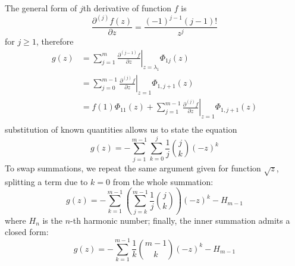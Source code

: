 The general form of $j$th derivative of function $f$ is 
$$\frac{\partial^{(j)}{f}(z)}{\partial{z}} =\frac{(-1)^{j-1}(j-1)!}{z^{j}}  $$ 
for $j \geq 1$, therefore
\begin{displaymath}
\begin{split}
  g(z) &= \sum_{j=1}^{m}{ \left. \frac{\partial^{(j-1)}{f}}{\partial{z}} \right|_{z=\lambda_{1}}\Phi_{1j}(z)} \\
       &= \sum_{j=0}^{m-1}{ \left. \frac{\partial^{(j)}{f}}{\partial{z}} \right|_{z=1}\Phi_{1,j+1}(z)} \\
       &= f(1)\Phi_{11}(z) + \sum_{j=1}^{m-1}{ \left. \frac{\partial^{(j)}{f}}{\partial{z}} \right|_{z=1}\Phi_{1,j+1}(z)} \\
\end{split}
\end{displaymath}
substitution of known quantities allows us to state the equation
\begin{equation}
  g(z) = - \sum_{j=1}^{m-1}{\sum_{k=0}^{j}{\frac{1}{j}{{j}\choose{k}}(-z)^{k}}}
\end{equation}
To swap summations, we repeat the same argument given for function $\sqrt{z}$, splitting
a term due to $k=0$ from the whole summation:
\begin{equation}
  g(z) = - \sum_{k=1}^{m-1}{\left(\sum_{j=k}^{m-1}{\frac{1}{j}{{j}\choose{k}}}\right)}(-z)^{k} - H_{m-1} 
\end{equation}
where $H_{n}$ is the $n$-th harmonic number; finally, the inner summation admits
a closed form:
\begin{equation}
  g(z) = - \sum_{k=1}^{m-1}\frac{1}{k}{{m-1}\choose{k}}{(-z)^{k}}- H_{m-1} 
\end{equation}

